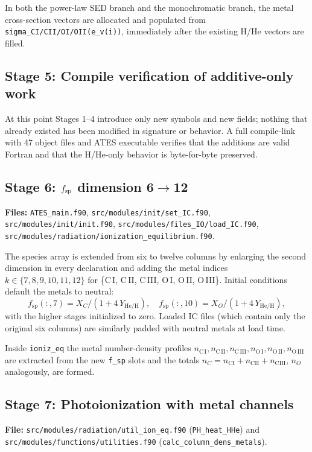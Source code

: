\documentclass[english,a4paper]{kiseon_memo}
\begin{document}
In both the power-law SED branch and the monochromatic branch, the
metal cross-section vectors are allocated and populated from
\texttt{sigma\_CI/CII/OI/OII(e\_v(i))}, immediately after the
existing H/He vectors are filled.

\subsection{Stage 5: Compile verification of additive-only work}
At this point Stages 1--4 introduce only new symbols and new fields;
nothing that already existed has been modified in signature or
behavior.  A full compile-link with 47 object files and ATES executable
verifies that the additions are valid Fortran and that the H/He-only
behavior is byte-for-byte preserved.

\subsection{Stage 6: $f_{\rm sp}$ dimension 6$\to$12}
\begin{sloppypar}
\textbf{Files:} \texttt{ATES\_main.f90},
\texttt{src/modules/init/set\_IC.f90},
\texttt{src/modules/init/init.f90},
\texttt{src/modules/files\_IO/load\_IC.f90},
\texttt{src/modules/radiation/ionization\_equilibrium.f90}.
\end{sloppypar}

The species array is extended from six to twelve columns by enlarging
the second dimension in every declaration and adding the metal indices
\(k \in \{7,8,9,10,11,12\}\) for
\{C\,I, C\,II, C\,III, O\,I, O\,II, O\,III\}.  Initial conditions
default the metals to neutral:
\[
  f_\mathrm{sp}(:, 7) = X_C / (1 + 4\,Y_{\!\mathrm{He/H}}), \quad
  f_\mathrm{sp}(:, 10) = X_O / (1 + 4\,Y_{\!\mathrm{He/H}}),
\]
with the higher stages initialized to zero.  Loaded IC files (which
contain only the original six columns) are similarly padded with
neutral metals at load time.

Inside \texttt{ioniz\_eq} the metal number-density profiles
\(n_{\mathrm{C\,I}}, n_{\mathrm{C\,II}}, n_{\mathrm{C\,III}},
n_{\mathrm{O\,I}}, n_{\mathrm{O\,II}}, n_{\mathrm{O\,III}}\) are
extracted from the new \texttt{f\_sp} slots and the totals
\(n_C = n_\mathrm{CI} + n_\mathrm{CII} + n_\mathrm{CIII}\),
\(n_O\) analogously, are formed.

\subsection{Stage 7: Photoionization with metal channels}
\textbf{File:} \texttt{src/modules/radiation/util\_ion\_eq.f90}
(\texttt{PH\_heat\_HHe}) and
\texttt{src/modules/functions/utilities.f90}
(\texttt{calc\_column\_dens\_metals}).
\end{document}
